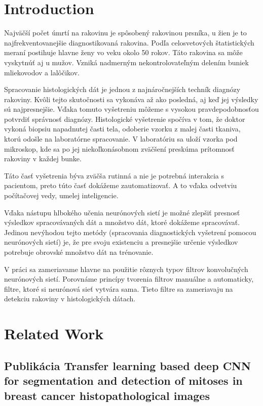 \documentclass[runningheads]{llncs}
\begin{document}
\section{Introduction}
Najväčší počet úmrtí na rakovinu je spôsobený rakovinou prsníka, u žien je to najfrekventovanejšie diagnostikovaná rakovina. Podľa celosvetových štatistických meraní postihuje hlavne ženy vo veku okolo 50 rokov. Táto rakovina sa môže vyskytnúť aj u mužov. Vzniká nadmerným nekontrolovateľným delením buniek mliekovodov a lalôčikov. 

Spracovanie histologických dát je jednou z najnáročnejších techník diagnózy rakoviny. Kvôli tejto skutočnosti sa vykonáva až ako posledná, aj keď jej výsledky sú najpresnejšie. Vďaka tomuto vyšetreniu môžeme s vysokou pravdepodobnosťou potvrdiť správnosť diagnózy. Histologické vyšetrenie spočíva v tom, že doktor vykoná biopsiu napadnutej časti tela, odoberie vzorku z malej časti tkaniva, ktorú odošle na laboratórne spracovanie. V laboratóriu sa uloží vzorka pod mikroskop, kde sa po jej niekoľkonásobnom zväčšení  preskúma prítomnosť rakoviny v každej bunke. 

Táto časť vyšetrenia býva zväčša rutinná a nie je potrebná interakcia s pacientom, preto túto časť dokážeme zautomatizovať. A to vďaka odvetviu počítačovej vedy, umelej inteligencie.

Vďaka nástupu hlbokého učenia neurónových sietí je možné zlepšiť presnosť  výsledkov spracovávaných dát a množstvo dát, ktoré dokážeme spracovávať. Jedinou nevýhodou tejto metódy (spracovania diagnostických vyšetrení pomocou neurónových sietí)  je, že pre svoju existenciu a presnejšie určenie výsledkov potrebuje obrovské množstvo dát na trénovanie. 

V práci sa zameriavame hlavne na použitie rôznych typov filtrov  konvolučných neurónových sietí. Porovnáme princípy tvorenia filtrov manuálne a automaticky, filtre, ktoré si neurónová sieť vytvára sama. Tieto filtre sa zameriavaju na detekciu rakoviny v histologických dátach.
\section{Related Work}

\subsection{Publikácia Transfer learning based deep CNN for segmentation and detection of mitoses in breast cancer histopathological images \cite{Transferlearningbaseddeep}}
\end{document}
